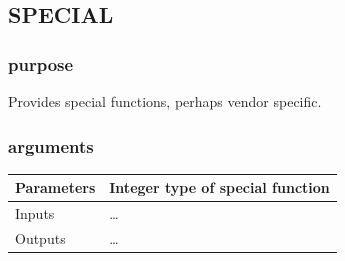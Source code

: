 \documentclass[10pt,a4paper,twoside,fleqn]{book}
\begin{document}
%            
%
%            
%
%
%            
%            
%




        \subsection{SPECIAL}

            \subsubsection{purpose}
            
                Provides special functions, perhaps vendor specific.
                
            \subsubsection{arguments}
            
                \begin{tabular}{| l | l |}
                \hline
                Parameters  & Integer type of special function \\
                \hline
                Inputs      & \ldots \\
                \hline
                Outputs     & \ldots \\
                \hline
                \end{tabular}
\end{document}
